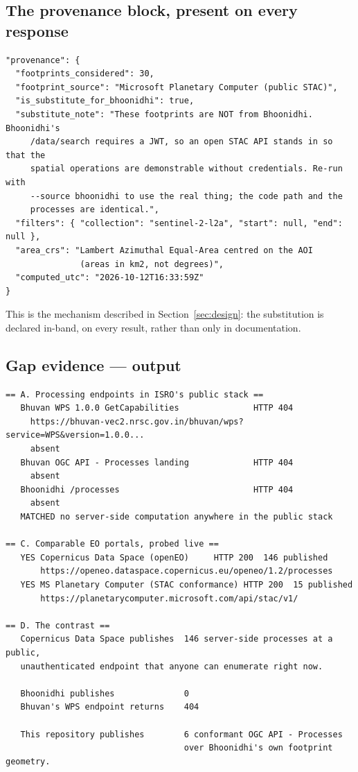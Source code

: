 \subsection{The provenance block, present on every response}
\label{app:provenance}

\begin{lstlisting}[style=json]
"provenance": {
  "footprints_considered": 30,
  "footprint_source": "Microsoft Planetary Computer (public STAC)",
  "is_substitute_for_bhoonidhi": true,
  "substitute_note": "These footprints are NOT from Bhoonidhi. Bhoonidhi's
     /data/search requires a JWT, so an open STAC API stands in so that the
     spatial operations are demonstrable without credentials. Re-run with
     --source bhoonidhi to use the real thing; the code path and the
     processes are identical.",
  "filters": { "collection": "sentinel-2-l2a", "start": null, "end": null },
  "area_crs": "Lambert Azimuthal Equal-Area centred on the AOI
               (areas in km2, not degrees)",
  "computed_utc": "2026-10-12T16:33:59Z"
}
\end{lstlisting}

This is the mechanism described in Section~\ref{sec:design}: the substitution
is declared in-band, on every result, rather than only in documentation.

\subsection{Gap evidence ---  output}

\begin{lstlisting}
== A. Processing endpoints in ISRO's public stack ==
   Bhuvan WPS 1.0.0 GetCapabilities               HTTP 404
     https://bhuvan-vec2.nrsc.gov.in/bhuvan/wps?service=WPS&version=1.0.0...
     absent
   Bhuvan OGC API - Processes landing             HTTP 404
     absent
   Bhoonidhi /processes                           HTTP 404
     absent
   MATCHED no server-side computation anywhere in the public stack

== C. Comparable EO portals, probed live ==
   YES Copernicus Data Space (openEO)     HTTP 200  146 published
       https://openeo.dataspace.copernicus.eu/openeo/1.2/processes
   YES MS Planetary Computer (STAC conformance) HTTP 200  15 published
       https://planetarycomputer.microsoft.com/api/stac/v1/

== D. The contrast ==
   Copernicus Data Space publishes  146 server-side processes at a public,
   unauthenticated endpoint that anyone can enumerate right now.

   Bhoonidhi publishes              0
   Bhuvan's WPS endpoint returns    404

   This repository publishes        6 conformant OGC API - Processes
                                    over Bhoonidhi's own footprint geometry.
\end{lstlisting}


